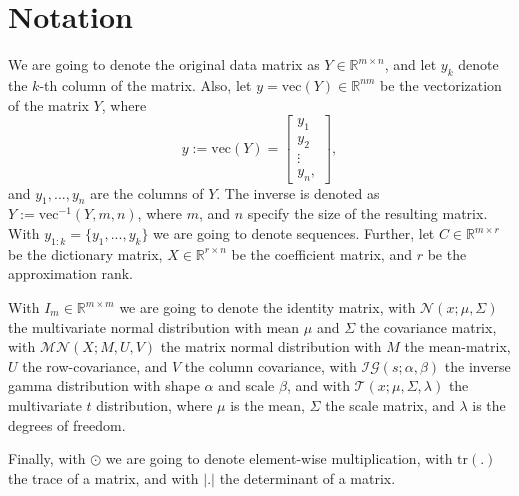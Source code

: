 \documentclass{mldsmsc}
\begin{document}
\section{Notation}

We are going to denote the original data matrix as $Y \in \mathbb{R}^{m \times n}$, and let $y_k$ denote the $k$-th column of the matrix. Also, let $y = \text{vec}(Y) \in \mathbb{R}^{nm}$ be the vectorization of the matrix $Y$, where
\begin{equation}
    y := \text{vec}(Y) = \begin{bmatrix}
        y_1 \\
        y_2 \\
        \vdots \\
        y_n, 
    \end{bmatrix},
\end{equation}
and $y_1, ..., y_n$ are the columns of $Y$. The inverse is denoted as $Y := \text{vec}^{-1}(Y, m, n)$, where $m$, and $n$ specify the size of the resulting matrix. With $y_{1:k} = \{y_1, ..., y_k\}$ we are going to denote sequences. Further, let $C \in \mathbb{R}^{m \times r}$ be the dictionary matrix, $X \in \mathbb{R}^{r \times n}$ be the coefficient matrix, and $r$ be the approximation rank. \newline

\noindent With $I_m \in \mathbb{R}^{m \times m}$ we are going to denote the identity matrix, with $\mathcal{N}(x; \mu, \Sigma)$ the multivariate normal distribution with mean $\mu$ and $\Sigma$ the covariance matrix, with $\mathcal{MN}(X; M, U, V)$ the matrix normal distribution with $M$ the mean-matrix, $U$ the row-covariance, and $V$ the column covariance, with  $\mathcal{IG}(s; \alpha, \beta)$ the inverse gamma distribution with shape $\alpha$ and scale $\beta$, and with $\mathcal{T}(x; \mu, \Sigma, \lambda)$ the multivariate $t$ distribution, where $\mu$ is the mean, $\Sigma$ the scale matrix, and $\lambda$ is the degrees of freedom. \newline

\noindent Finally, with $\odot$ we are going to denote element-wise multiplication, with $\text{tr}(.)$ the trace of a matrix, and with $|.|$ the determinant of a matrix.


\end{document}
